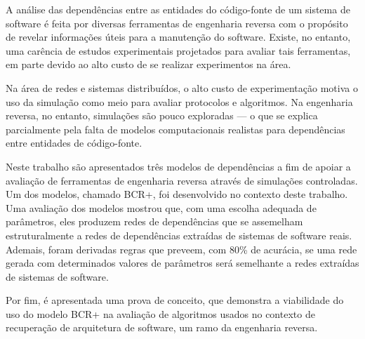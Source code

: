 
A análise das dependências entre as entidades do código-fonte de um sistema de software é feita por diversas ferramentas de engenharia reversa com o propósito de revelar informações úteis para a manutenção do software. Existe, no entanto, uma carência de estudos experimentais projetados para avaliar tais ferramentas, em parte devido ao alto custo de se realizar experimentos na área. 

Na área de redes e sistemas distribuídos, o alto custo de experimentação motiva o uso da simulação como meio para avaliar protocolos e algoritmos. Na engenharia reversa, no entanto, simulações são pouco exploradas --- o que se explica parcialmente pela falta de modelos computacionais realistas para dependências entre entidades de código-fonte.

Neste trabalho são apresentados três modelos de dependências a fim de apoiar a avaliação de ferramentas de engenharia reversa através de simulações controladas. Um dos modelos, chamado BCR+, foi desenvolvido no contexto deste trabalho. Uma avaliação dos modelos mostrou que, com uma escolha adequada de parâmetros, eles produzem redes de dependências que se assemelham estruturalmente a redes de dependências extraídas de sistemas de software reais. Ademais, foram derivadas regras que preveem, com 80\% de acurácia, se uma rede gerada com determinados valores de parâmetros será semelhante a redes extraídas de sistemas de software.

Por fim, é apresentada uma prova de conceito, que demonstra a viabilidade do uso do modelo BCR+ na avaliação de algoritmos usados no contexto de recuperação de arquitetura de software, um ramo da engenharia reversa.




